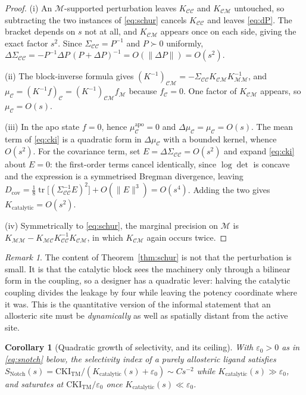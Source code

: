 \documentclass[11pt,reqno]{amsart}
\theoremstyle{plain}
\newtheorem{corollary}[theorem]{Corollary}
\theoremstyle{definition}
\theoremstyle{remark}
\newtheorem{remark}[theorem]{Remark}
\numberwithin{equation}{section}
\newcommand{\CKI}{\mathrm{CKI}}
\newcommand{\Kcat}{K_{\mathrm{catalytic}}}
\newcommand{\CKItm}{\CKI_{\mathrm{TM}}}
\newcommand{\Snotch}{S_{\mathrm{Notch}}}
\newcommand{\CC}{\mathcal{C}}
\newcommand{\MM}{\mathcal{M}}
\begin{document}
\begin{proof}
(i) An $\MM$-supported perturbation leaves $K_{\CC\CC}$ and $K_{\CC\MM}$ untouched, so subtracting the two instances of \eqref{eq:schur} cancels $K_{\CC\CC}$ and leaves \eqref{eq:dP}. The bracket depends on $s$ not at all, and $K_{\CC\MM}$ appears once on each side, giving the exact factor $s^2$. Since $\Sigma_{\CC\CC}=P^{-1}$ and $P\succ0$ uniformly, $\Delta\Sigma_{\CC\CC}=-P^{-1}\Delta P\,(P+\Delta P)^{-1}=O(\|\Delta P\|)=O(s^2)$.

(ii) The block-inverse formula gives $(K^{-1})_{\CC\MM}=-\Sigma_{\CC\CC}K_{\CC\MM}K_{\MM\MM}^{-1}$, and $\mu_\CC=(K^{-1}f)_\CC=(K^{-1})_{\CC\MM}f_\MM$ because $f_\CC=0$. One factor of $K_{\CC\MM}$ appears, so $\mu_\CC=O(s)$.

(iii) In the apo state $f=0$, hence $\mu_\CC^{\mathrm{apo}}=0$ and $\Delta\mu_\CC=\mu_\CC=O(s)$. The mean term of \eqref{eq:cki} is a quadratic form in $\Delta\mu_\CC$ with a bounded kernel, whence $O(s^2)$. For the covariance term, set $E=\Delta\Sigma_{\CC\CC}=O(s^2)$ and expand \eqref{eq:cki} about $E=0$: the first-order terms cancel identically, since $\log\det$ is concave and the expression is a symmetrised Bregman divergence, leaving $D_{\mathrm{cov}}=\tfrac18\operatorname{tr}\bigl[(\Sigma_{\CC\CC}^{-1}E)^2\bigr]+O(\|E\|^3)=O(s^4)$. Adding the two gives $\Kcat=O(s^2)$.

(iv) Symmetrically to \eqref{eq:schur}, the marginal precision on $\MM$ is $K_{\MM\MM}-K_{\MM\CC}K_{\CC\CC}^{-1}K_{\CC\MM}$, in which $K_{\CC\MM}$ again occurs twice.
\end{proof}

\begin{remark}
The content of Theorem~\ref{thm:schur} is not that the perturbation is small. It is that the catalytic block sees the machinery only through a bilinear form in the coupling, so a designer has a quadratic lever: halving the catalytic coupling divides the leakage by four while leaving the potency coordinate where it was. This is the quantitative version of the informal statement that an allosteric site must be \emph{dynamically} as well as spatially distant from the active site.
\end{remark}

\begin{corollary}[Quadratic growth of selectivity, and its ceiling]
\label{cor:sel}
With $\varepsilon_0>0$ as in \eqref{eq:snotch} below, the selectivity index of a purely allosteric ligand satisfies
$\Snotch(s)=\CKItm/(\Kcat(s)+\varepsilon_0)\sim C s^{-2}$ while $\Kcat(s)\gg\varepsilon_0$, and saturates at $\CKItm/\varepsilon_0$ once $\Kcat(s)\ll\varepsilon_0$.
\end{corollary}
\end{document}
